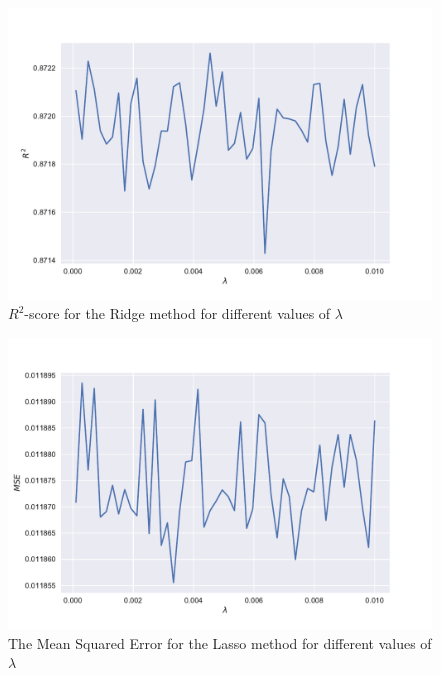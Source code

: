 \documentclass[a4paper,10pt,english]{article}
\begin{document}
\begin{figure}[h!]
	\centering 
	\includegraphics[scale=0.6]{../results/part_d_reg_R2.pdf}
	\caption{$R^2$-score for the Ridge method for different values of $\lambda$}
	\label{part_d_R2}
\end{figure}


\begin{figure}[h!]
	\centering 
	\includegraphics[scale=0.6]{../results/part_e_reg_MSE.pdf}
	\caption{The Mean Squared Error for the Lasso method for different values of $\lambda$}
	\label{part_e_MSE}
\end{figure}
\end{document}
